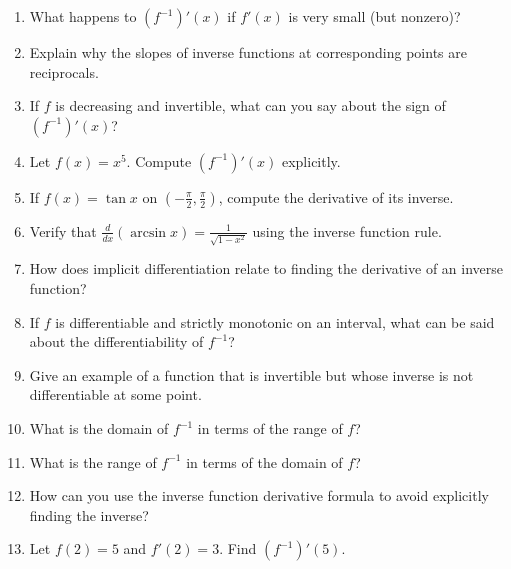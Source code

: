 \begin{enumerate}
  \item What happens to \(\left(f^{-1}\right)'(x)\) if \(f'(x)\) is very small (but nonzero)?
  \item Explain why the slopes of inverse functions at corresponding points are reciprocals.
  \item If \(f\) is decreasing and invertible, what can you say about the sign of \(\left(f^{-1}\right)'(x)\)?
  \item Let \(f(x) = x^{5}\). Compute \(\left(f^{-1}\right)'(x)\) explicitly.
  \item If \(f(x) = \tan x\) on \(\left(-\frac{\pi}{2}, \frac{\pi}{2}\right)\), compute the derivative of its inverse.
  \item Verify that \(\frac{d}{dx}(\arcsin x) = \frac{1}{\sqrt{1 - x^{2}}}\) using the inverse function rule.
  \item How does implicit differentiation relate to finding the derivative of an inverse function?
  \item If \(f\) is differentiable and strictly monotonic on an interval, what can be said about the differentiability of \(f^{-1}\)?
  \item Give an example of a function that is invertible but whose inverse is not differentiable at some point.
  \item What is the domain of \(f^{-1}\) in terms of the range of \(f\)?
  \item What is the range of \(f^{-1}\) in terms of the domain of \(f\)?
  \item How can you use the inverse function derivative formula to avoid explicitly finding the inverse?
  \item Let \(f(2) = 5\) and \(f'(2) = 3\). Find \(\left(f^{-1}\right)'(5)\).
\end{enumerate}
